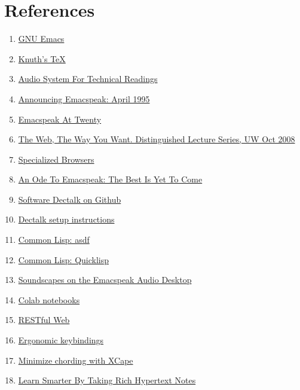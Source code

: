 \documentclass[11pt]{article}
\begin{document}
\section{References}
\label{sec:orgf538a6d}
\begin{enumerate}
\item \href{https://www.gnu.org/s/emacs/}{GNU Emacs}
\item \href{https://en.wikipedia.org/wiki/TeX}{Knuth's \TeX{}}
\item \href{https://emacspeak.blogspot.com/2022/12/aster-spoken-math-on-emacspeak-audio\_21.html}{Audio System For Technical Readings}
\item \href{https://tvraman.github.io/emacspeak//web/releases/release-3.0.html}{Announcing Emacspeak: April 1995}
\item \href{https://emacspeak.sourceforge.net/turning-twenty.html}{Emacspeak At Twenty}
\item \href{http://www.cs.washington.edu/htbin-post/mvis/mvis?ID=636}{The Web, The Way You Want.  Distinguished Lecture Series, UW Oct 2008}
\item \href{https://emacspeak.sourceforge.net/raman/publications/specialized-browsers/}{Specialized Browsers}
\item \href{https://tvraman.github.io/emacspeak/web/01-gemini.ogg}{An Ode To Emacspeak: The Best Is Yet To Come}
\item \href{https://github.com/dectalk/dectalk.git}{Software Dectalk on Github}
\item \href{https://raw.githubusercontent.com/tvraman/emacspeak/master/servers/software-dtk/Readme.org}{Dectalk  setup instructions}
\item \href{https://asdf.common-lisp.dev/asdf.html}{Common Lisp: asdf}
\item \href{https://www.quicklisp.org/}{Common Lisp: Quicklisp}
\item \href{https://emacspeak.blogspot.com/2015/12/soundscapes-on-emacspeak-audio-desktop.html}{Soundscapes on the Emacspeak Audio Desktop}
\item \href{https://colab.research.google.com/}{Colab notebooks}
\item \href{https://en.wikipedia.org/wiki/REST}{RESTful Web}
\item \href{https://emacspeak.blogspot.com/2023/09/emacs-ergonomics-dont-punish-your.html}{Ergonomic keybindings}
\item \href{https://github.com/alols/xcape}{Minimize chording with XCape}
\item \href{https://emacspeak.blogspot.com/2022/10/learn-smarter-by-taking-rich-hypertext.html}{Learn Smarter By Taking Rich Hypertext Notes}

\end{enumerate}
\end{document}

